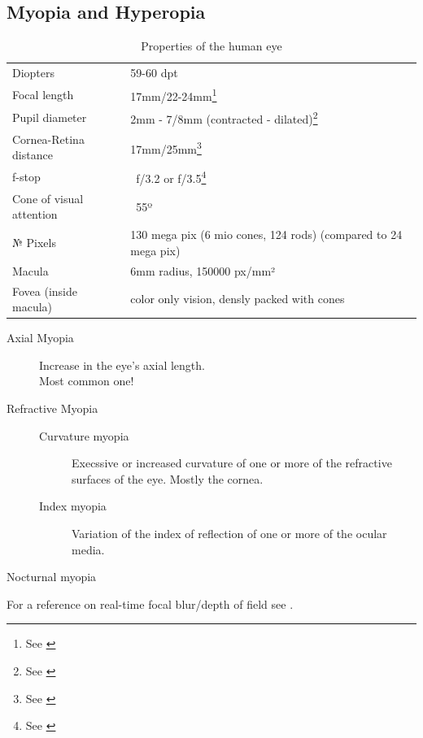 \documentclass{acm_proc_article-sp}
\begin{document}
\subsection{Myopia and Hyperopia}
\begin{table}
    \centering
    \begin{tabular}{ll}
        Diopters                & 59-60 dpt \\
        Focal length            & 17mm/22-24mm\footnote{See \cite{eye-focal, eyeascamera}} \\
        Pupil diameter          & 2mm - 7/8mm (contracted - dilated)\footnote{See \cite{eyeascamera}} \\
        Cornea-Retina distance  & 17mm/25mm\footnote{See \cite{eyeascamera}} \\
        f-stop                  & ~f/3.2 or f/3.5\footnote{See \cite{eyeascamera}} \\
        Cone of visual attention& ~55º \\
        № Pixels                & 130 mega pix (6 mio cones, 124 rods) (compared to 24 mega pix) \\
        Macula                  & 6mm radius, 150000 px/mm²\\
        Fovea (inside macula)   & color only vision, densly packed with cones \\
    \end{tabular}
    \caption{Properties of the human eye}
    \label{tab:eyeproperties}
\end{table}
\begin{description}
\item[Axial Myopia]
    Increase in the eye's axial length.\\
    Most common one!
\item[Refractive Myopia]
    \begin{description}
    \item[Curvature myopia]
    Execssive or increased curvature of one or more of the refractive surfaces of the eye. Mostly the cornea.
    \item[Index myopia]
    Variation of the index of reflection of one or more of the ocular media.
    \end{description}
\item[Nocturnal myopia]
\end{description}

For a reference on real-time focal blur/depth of field see \cite{gpugems-DoF, gpugems3-DoF}.
\end{document}
